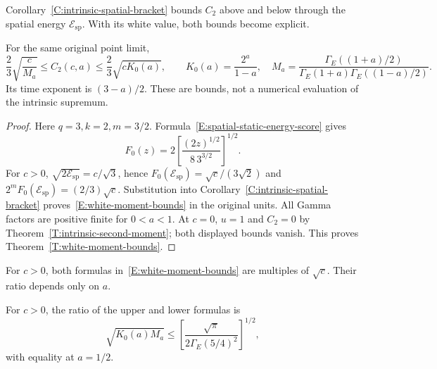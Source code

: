 Corollary~\ref{C:intrinsic-spatial-bracket} bounds $C_2$ above and below
through the spatial energy $\mathcal{E}_{\mathrm{sp}}$. With its white value,
both bounds become explicit.

\begin{theorem}\label{T:white-moment-bounds}
  For the same original point limit,
  \begin{equation}\label{E:white-moment-bounds}
    \frac23\sqrt{\frac{c}{M_a}}\le C_2(c,a)
    \le\frac23\sqrt{cK_0(a)},\qquad
    K_0(a)=\frac{2^a}{1-a},\quad
    M_a=\frac{\Gamma_E((1+a)/2)}
    {\Gamma_E(1+a)\Gamma_E((1-a)/2)} .
  \end{equation}
  Its time exponent is $(3-a)/2$. These are bounds, not a numerical evaluation
  of the intrinsic supremum.
\end{theorem}

\begin{proof}
  Here $q = 3,k = 2,m = 3/2$. Formula~\eqref{E:spatial-static-energy-score}
  gives
  \[
    F_0(z)=2\left[\frac{(2z)^{1/2}}{8\,3^{3/2}}\right]^{1/2}.
  \]
  For $c > 0$, $\sqrt{2\mathcal{E}_{\mathrm{sp}}} = c/\sqrt3$, hence
  $F_0(\mathcal{E}_{\mathrm{sp}}) = \sqrt c/(3\sqrt2)$ and
  $2^mF_0(\mathcal{E}_{\mathrm{sp}}) = (2/3)\sqrt c$. Substitution into
  Corollary~\ref{C:intrinsic-spatial-bracket}
  proves~\eqref{E:white-moment-bounds} in the original units. All Gamma factors
  are positive finite for $0 < a < 1$. At $c = 0$, $u = 1$ and $C_2 = 0$ by
  Theorem~\ref{T:intrinsic-second-moment}; both displayed bounds vanish. This
  proves Theorem~\ref{T:white-moment-bounds}.
\end{proof}

For $c>0$, both formulas in~\eqref{E:white-moment-bounds} are multiples of
$\sqrt c$. Their ratio depends only on $a$.

\begin{corollary}
  \label{C:white-relative-width}
  For $c > 0$, the ratio of the upper and lower formulas is
  \[
    \sqrt{K_0(a)M_a}
    \le\left[\frac{\sqrt\pi}{2\Gamma_E(5/4)^2}\right]^{1/2},
  \]
  with equality at $a = 1/2$.
\end{corollary}

